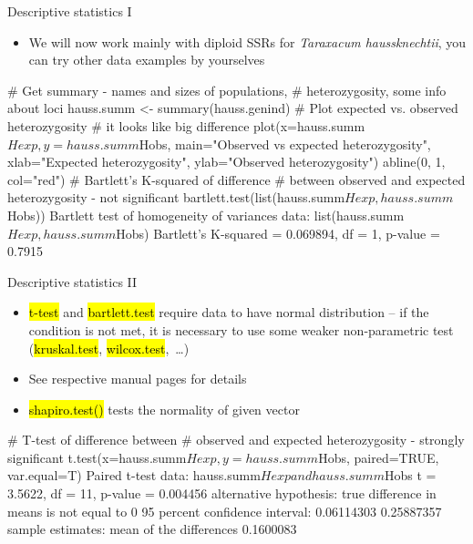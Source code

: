 \documentclass[compress, ucs, xelatex, 11pt, xcolor=svgnames,
  hyperref={
    bookmarks=true,
    unicode=true,
    colorlinks=true,
    pdftitle={Molecular data in R},
    plainpages=false,
    pdfauthor={Vojtech Zeisek},
    pdfsubject={Course about phylogeny and evolution in R},
    pdfcreator={XeLaTeX},
    pdfkeywords={R, evolution, phylogeny, molecular data},
    linkcolor=Tomato,
    anchorcolor=SaddleBrown,
    citecolor=Goldenrod,
    filecolor=DarkMagenta,
    menucolor=Sienna,
    urlcolor=DarkTurquoise,
    pdftex},
  url={hyphens, lowtilde} %
  ]{beamer}
\renewcommand{\texttt}[1]{\hl{\ttfamily #1}}
\begin{document}
\begin{frame}[fragile]{Descriptive statistics I}
  \label{popgenindx}
  \begin{itemize}
    \item We will now work mainly with diploid SSRs for \textit{Taraxacum haussknechtii}, you can try other data examples by yourselves
  \end{itemize}
  \begin{spluscode}
    # Get summary - names and sizes of populations,
    # heterozygosity, some info about loci
    hauss.summ <- summary(hauss.genind)
    # Plot expected vs. observed heterozygosity
    # it looks like big difference
    plot(x=hauss.summ$Hexp, y=hauss.summ$Hobs,
      main="Observed vs expected heterozygosity",
      xlab="Expected heterozygosity", ylab="Observed heterozygosity")
    abline(0, 1, col="red")
    # Bartlett's K-squared of difference
    # between observed and expected heterozygosity - not significant
    bartlett.test(list(hauss.summ$Hexp, hauss.summ$Hobs))
                  Bartlett test of homogeneity of variances
    data:  list(hauss.summ$Hexp, hauss.summ$Hobs)
    Bartlett's K-squared = 0.069894, df = 1, p-value = 0.7915
  \end{spluscode}
\end{frame}

\begin{frame}[fragile]{Descriptive statistics II}
  \begin{itemize}
    \item \texttt{t-test} and \texttt{bartlett.test} require data to have normal distribution -- if the condition is not met, it is necessary to use some weaker non-parametric test (\texttt{kruskal.test}, \texttt{wilcox.test},~\ldots)
    \item See respective manual pages for details
    \item \texttt{shapiro.test()} tests the normality of given vector
  \end{itemize}
  \begin{spluscode}
    # T-test of difference between
    # observed and expected heterozygosity - strongly significant
    t.test(x=hauss.summ$Hexp, y=hauss.summ$Hobs, paired=TRUE, var.equal=T)
                 Paired t-test
    data:  hauss.summ$Hexp and hauss.summ$Hobs
    t = 3.5622, df = 11, p-value = 0.004456
    alternative hypothesis: true difference in means is not equal to 0
    95 percent confidence interval:
     0.06114303 0.25887357
    sample estimates:
    mean of the differences
                  0.1600083
  \end{spluscode}
\end{frame}
\end{document}
